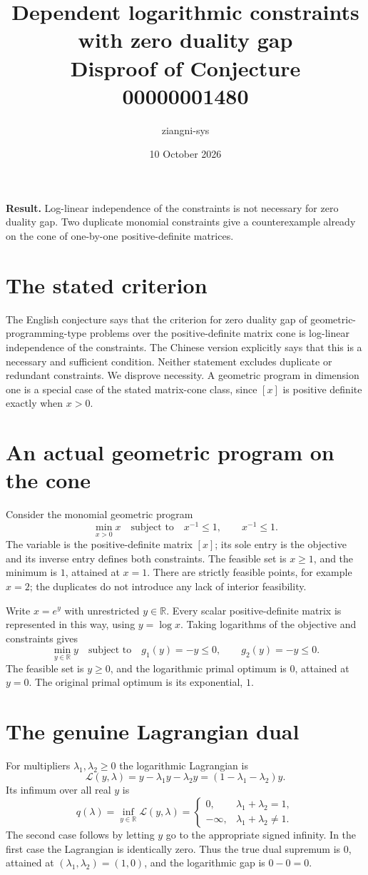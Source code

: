 \documentclass[11pt]{article}
\title{Dependent logarithmic constraints with zero duality gap\\\large Disproof of Conjecture 00000001480}
\author{ziangni-sys}\date{10 October 2026}
\begin{document}
\maketitle
\noindent\textbf{Result.} Log-linear independence of the constraints is not necessary for zero duality gap. Two duplicate monomial constraints give a counterexample already on the cone of one-by-one positive-definite matrices.

\section*{The stated criterion}
The English conjecture says that the criterion for zero duality gap of geometric-programming-type problems over the positive-definite matrix cone is log-linear independence of the constraints. The Chinese version explicitly says that this is a necessary and sufficient condition. Neither statement excludes duplicate or redundant constraints. We disprove necessity. A geometric program in dimension one is a special case of the stated matrix-cone class, since $[x]$ is positive definite exactly when $x>0$.

\section*{An actual geometric program on the cone}
Consider the monomial geometric program
\[
 \min_{x>0} x
 \quad\text{subject to}\quad
 x^{-1}\le1,\qquad x^{-1}\le1.
\]
The variable is the positive-definite matrix $[x]$; its sole entry is the objective and its inverse entry defines both constraints. The feasible set is $x\ge1$, and the minimum is $1$, attained at $x=1$. There are strictly feasible points, for example $x=2$; the duplicates do not introduce any lack of interior feasibility.

Write $x=e^y$ with unrestricted $y\in\mathbb R$. Every scalar positive-definite matrix is represented in this way, using $y=\log x$. Taking logarithms of the objective and constraints gives
\[
 \min_{y\in\mathbb R} y
 \quad\text{subject to}\quad
 g_1(y)=-y\le0,\qquad g_2(y)=-y\le0.
\]
The feasible set is $y\ge0$, and the logarithmic primal optimum is $0$, attained at $y=0$. The original primal optimum is its exponential, $1$.

\section*{The genuine Lagrangian dual}
For multipliers $\lambda_1,\lambda_2\ge0$ the logarithmic Lagrangian is
\[
 \mathcal L(y,\lambda)=y-\lambda_1 y-\lambda_2 y
 =(1-\lambda_1-\lambda_2)y.
\]
Its infimum over all real $y$ is
\[
 q(\lambda)=\inf_{y\in\mathbb R}\mathcal L(y,\lambda)
 =\begin{cases}
 0,&\lambda_1+\lambda_2=1,\\
 -\infty,&\lambda_1+\lambda_2\ne1.
 \end{cases}
\]
The second case follows by letting $y$ go to the appropriate signed infinity. In the first case the Lagrangian is identically zero. Thus the true dual supremum is $0$, attained at $(\lambda_1,\lambda_2)=(1,0)$, and the logarithmic gap is $0-0=0$.
\end{document}
